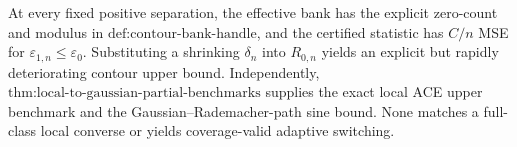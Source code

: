At every fixed positive separation, the effective bank has the explicit zero-count and modulus in \(\text{def:contour-bank-handle}\), and the certified statistic has \(C/n\) MSE for \(\varepsilon_{1,n}\le\varepsilon_0\).  Substituting a shrinking \(\delta_n\) into \(R_{0,n}\) yields an explicit but rapidly deteriorating contour upper bound.  Independently, \(\text{thm:local-to-gaussian-partial-benchmarks}\) supplies the exact local ACE upper benchmark and the Gaussian--Rademacher-path sine bound.  None matches a full-class local converse or yields coverage-valid adaptive switching.